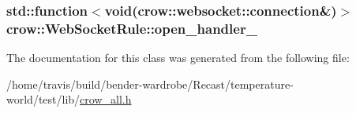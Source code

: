 \hypertarget{classcrow_1_1_web_socket_rule_ad47b29bdeac8e96f0f3b582fbc86b05e}{
\subsubsection[{open\-\_\-handler\-\_\-}]{\setlength{\rightskip}{0pt plus 5cm}std\-::function$<$void({\bf crow\-::websocket\-::connection}\&)$>$ crow\-::\-Web\-Socket\-Rule\-::open\-\_\-handler\-\_\-\hspace{0.3cm}{\ttfamily [protected]}}}\label{classcrow_1_1_web_socket_rule_ad47b29bdeac8e96f0f3b582fbc86b05e}


The documentation for this class was generated from the following file\-:\begin{DoxyCompactItemize}
\item 
/home/travis/build/bender-\/wardrobe/\-Recast/temperature-\/world/test/lib/\hyperlink{crow__all_8h}{crow\-\_\-all.\-h}\end{DoxyCompactItemize}
